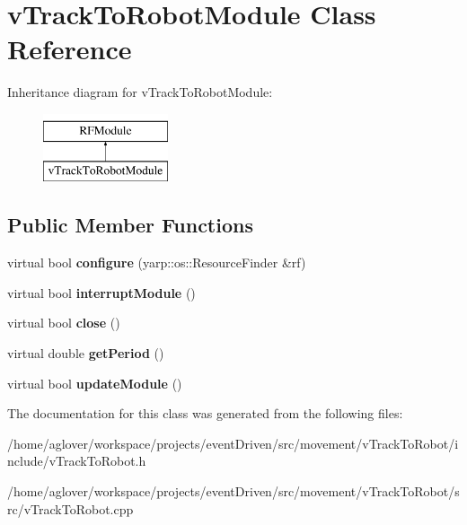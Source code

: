 \hypertarget{classvTrackToRobotModule}{\section{v\-Track\-To\-Robot\-Module Class Reference}
\label{classvTrackToRobotModule}
}
Inheritance diagram for v\-Track\-To\-Robot\-Module\-:\begin{figure}[H]
\begin{center}
\leavevmode
\includegraphics[height=2.000000cm]{classvTrackToRobotModule}
\end{center}
\end{figure}
\subsection*{Public Member Functions}
\begin{DoxyCompactItemize}
\item 
\hypertarget{classvTrackToRobotModule_ac724b3b5b9a538f211b062d2adf0118d}{virtual bool {\bfseries configure} (yarp\-::os\-::\-Resource\-Finder \&rf)}\label{classvTrackToRobotModule_ac724b3b5b9a538f211b062d2adf0118d}

\item 
\hypertarget{classvTrackToRobotModule_ae91ddadef668498e269699c848d388b1}{virtual bool {\bfseries interrupt\-Module} ()}\label{classvTrackToRobotModule_ae91ddadef668498e269699c848d388b1}

\item 
\hypertarget{classvTrackToRobotModule_a82d1ba0a15150dd2763b61cd80a33b1c}{virtual bool {\bfseries close} ()}\label{classvTrackToRobotModule_a82d1ba0a15150dd2763b61cd80a33b1c}

\item 
\hypertarget{classvTrackToRobotModule_adb673c97a3c36730d5d7a36da24a32e7}{virtual double {\bfseries get\-Period} ()}\label{classvTrackToRobotModule_adb673c97a3c36730d5d7a36da24a32e7}

\item 
\hypertarget{classvTrackToRobotModule_ada6ea3de8172c79d5f3a63b79db0c220}{virtual bool {\bfseries update\-Module} ()}\label{classvTrackToRobotModule_ada6ea3de8172c79d5f3a63b79db0c220}

\end{DoxyCompactItemize}


The documentation for this class was generated from the following files\-:\begin{DoxyCompactItemize}
\item 
/home/aglover/workspace/projects/event\-Driven/src/movement/v\-Track\-To\-Robot/include/v\-Track\-To\-Robot.\-h\item 
/home/aglover/workspace/projects/event\-Driven/src/movement/v\-Track\-To\-Robot/src/v\-Track\-To\-Robot.\-cpp\end{DoxyCompactItemize}
